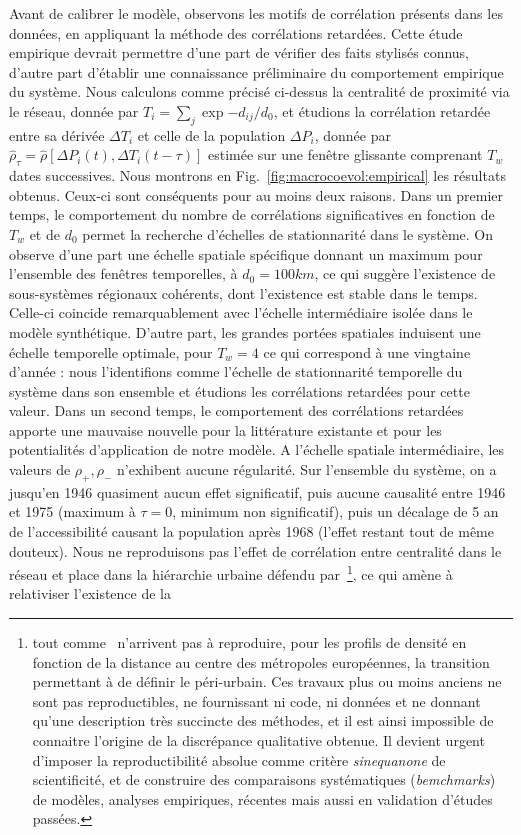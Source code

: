 Avant de calibrer le modèle, observons les motifs de corrélation présents dans les données, en appliquant la méthode des corrélations retardées. Cette étude empirique devrait permettre d'une part de vérifier des faits stylisés connus, d'autre part d'établir une connaissance préliminaire du comportement empirique du système. Nous calculons comme précisé ci-dessus la centralité de proximité via le réseau, donnée par $T_i = \sum_j \exp{-d_{ij}/d_0}$, et étudions la corrélation retardée entre sa dérivée $\Delta T_i$ et celle de la population $\Delta P_i$, donnée par $\hat{\rho}_{\tau} = \hat{\rho}\left[\Delta P_i(t),\Delta T_i(t-\tau)\right]$ estimée sur une fenêtre glissante comprenant $T_w$ dates successives. Nous montrons en Fig.~\ref{fig:macrocoevol:empirical} les résultats obtenus. Ceux-ci sont conséquents\comment[AB]{:-)} pour au moins deux raisons. Dans un premier temps, le comportement du nombre de corrélations significatives en fonction de $T_w$ et de $d_0$ permet la recherche d'échelles de stationnarité dans le système. On observe d'une part une échelle spatiale spécifique donnant un maximum pour l'ensemble des fenêtres temporelles, à $d_0 = 100km$, ce qui suggère l'existence de sous-systèmes régionaux cohérents, dont l'existence est stable dans le temps. Celle-ci coincide remarquablement avec l'échelle intermédiaire isolée dans le modèle synthétique. D'autre part, les grandes portées spatiales induisent une échelle temporelle optimale, pour $T_w = 4$ ce qui correspond à une vingtaine d'année : nous l'identifions comme l'échelle de stationnarité temporelle du système dans son ensemble et étudions les corrélations retardées pour cette valeur. Dans un second temps, le comportement des corrélations retardées apporte une mauvaise nouvelle\comment[AB]{:-)} pour la littérature existante et pour les potentialités d'application de notre modèle. A l'échelle spatiale intermédiaire, les valeurs de $\rho_+,\rho_-$ n'exhibent aucune régularité. Sur l'ensemble du système, on a jusqu'en 1946 quasiment aucun effet significatif, puis aucune causalité entre 1946 et 1975 (maximum à $\tau = 0$, minimum non significatif), puis un décalage de 5 an de l'accessibilité causant la population après 1968 (l'effet restant tout de même douteux). Nous ne reproduisons pas l'effet de corrélation entre centralité dans le réseau et place dans la hiérarchie urbaine défendu par~\cite{bretagnolle2003vitesse}\footnote{tout comme~\cite{lemoy2017scaling} n'arrivent pas à reproduire, pour les profils de densité en fonction de la distance au centre des métropoles européennes, la transition permettant à \cite{guerois2008built} de définir le péri-urbain. Ces travaux plus ou moins anciens ne sont pas reproductibles, ne fournissant ni code, ni données et ne donnant qu'une description très succincte des méthodes, et il est ainsi impossible de connaitre l'origine de la discrépance qualitative obtenue. Il devient urgent d'imposer la reproductibilité absolue comme critère \emph{sinequanone} de scientificité, et de construire des comparaisons systématiques (\emph{bemchmarks}) de modèles, analyses empiriques, récentes mais aussi en validation d'études passées.}, ce qui amène à relativiser l'existence de la 